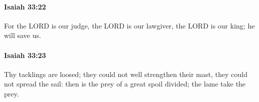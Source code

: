		\paragraph{Isaiah 33:22} %
			\label{ISAIAH-33-22}

			For the LORD is our judge, the LORD is our lawgiver, the LORD is our king; he will save us.


		\paragraph{Isaiah 33:23} %
			\label{ISAIAH-33-23}

			Thy tacklings are loosed; they could not well strengthen their mast, they could not spread the sail: then is the prey of a great spoil divided; the lame take the prey.


